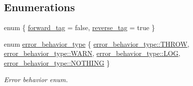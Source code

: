 \subsection*{Enumerations}
\begin{DoxyCompactItemize}
\item 
enum \{ \hyperlink{namespaceIceBRG_a3f2c2517005b9902e3eb97894b072f91ac4e94566c20918ca2fe2c7ccdfdec928}{forward\+\_\+tag} = false, 
\hyperlink{namespaceIceBRG_a3f2c2517005b9902e3eb97894b072f91a9793d1e2c6b63e17ed62034e78307b63}{reverse\+\_\+tag} = true
 \}
\item 
enum \hyperlink{namespaceIceBRG_afc0a41c01ba37ad05cd3032371417832}{error\+\_\+behavior\+\_\+type} \{ \hyperlink{namespaceIceBRG_afc0a41c01ba37ad05cd3032371417832a655474de4674aba7a436a73cd8d9a906}{error\+\_\+behavior\+\_\+type\+::\+T\+H\+R\+O\+W}, 
\hyperlink{namespaceIceBRG_afc0a41c01ba37ad05cd3032371417832a32bd8a1db2275458673903bdb84cb277}{error\+\_\+behavior\+\_\+type\+::\+W\+A\+R\+N}, 
\hyperlink{namespaceIceBRG_afc0a41c01ba37ad05cd3032371417832a4b5ffcdaf38ce4d463171f5c977c5ab3}{error\+\_\+behavior\+\_\+type\+::\+L\+O\+G}, 
\hyperlink{namespaceIceBRG_afc0a41c01ba37ad05cd3032371417832a8697250efc73639dd2a6e7da243ac68b}{error\+\_\+behavior\+\_\+type\+::\+N\+O\+T\+H\+I\+N\+G}
 \}\begin{DoxyCompactList}\small\item\em Error behavior enum. \end{DoxyCompactList}
\end{DoxyCompactItemize}
